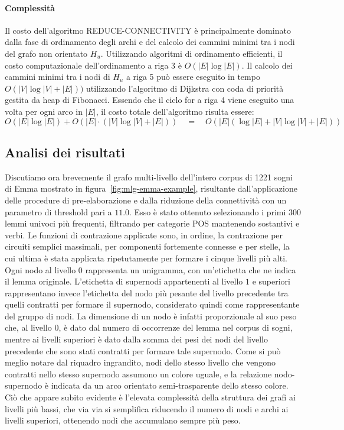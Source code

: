 \paragraph{Complessità}
Il costo dell'algoritmo REDUCE-CONNECTIVITY è principalmente dominato dalla fase di ordinamento degli archi
e del calcolo dei cammini minimi tra i nodi del grafo non orientato $H_u$.
Utilizzando algoritmi di ordinamento efficienti, il costo computazionale dell'ordinamento a riga 3 è $O(|E| \log |E|)$.
Il calcolo dei cammini minimi tra i nodi di $H_u$ a riga 5 può essere eseguito in tempo $O(|V| \log{|V|} + |E|))$
utilizzando l'algoritmo di Dijkstra con coda di priorità gestita da heap di Fibonacci.
Essendo che il ciclo for a riga 4 viene eseguito una volta per ogni arco in $|E|$, il costo totale dell'algoritmo
risulta essere:
\begin{equation*}
      O(|E| \log |E|) + O(|E| \cdot (|V| \log{|V|} + |E|)) \quad = \quad
      O(|E| (\log |E| + |V| \log{|V|} + |E|))
\end{equation*}

\subsection{Analisi dei risultati}\label{subsec:analisi-del-grafo-multi-livello}

Discutiamo ora brevemente il grafo multi-livello dell'intero corpus di 1221 sogni di Emma mostrato in
figura~\ref{fig:mlg-emma-example}, risultante dall'applicazione delle procedure di pre-elaborazione e dalla riduzione
della connettività con un parametro di threshold pari a $11.0$.
Esso è stato ottenuto selezionando i primi 300 lemmi univoci più frequenti, filtrando per categorie POS mantenendo
sostantivi e verbi.
Le funzioni di contrazione applicate sono, in ordine, la contrazione per circuiti semplici massimali,
per componenti fortemente connesse e per stelle, la cui ultima è stata applicata ripetutamente per
formare i cinque livelli più alti.
Ogni nodo al livello $0$ rappresenta un unigramma, con un'etichetta che ne indica il lemma originale. L'etichetta di
supernodi appartenenti al livello $1$ e superiori rappresentano invece l'etichetta del nodo più pesante del livello
precedente tra quelli contratti per formare il supernodo, considerato quindi come rappresentante del gruppo di nodi.
La dimensione di un nodo è infatti proporzionale al suo peso che, al livello $0$, è dato dal numero di occorrenze del
lemma nel corpus di sogni, mentre ai livelli superiori è dato dalla somma dei pesi dei nodi del livello precedente che
sono stati contratti per formare tale supernodo.
Come si può meglio notare dal riquadro ingrandito, nodi dello stesso livello che vengono contratti nello stesso
supernodo assumono un colore uguale, e la relazione nodo-supernodo è indicata da un arco orientato
semi-trasparente dello stesso colore.
Ciò che appare subito evidente è l'elevata complessità della struttura dei grafi ai livelli più bassi, che
via via si semplifica riducendo il numero di nodi e archi ai livelli superiori, ottenendo nodi che accumulano
sempre più peso.

